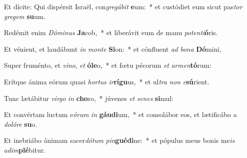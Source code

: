 \item Et dícite: Qui dispérsit Israël, con\textit{gre}\textit{gá}\textit{bit} \textbf{e}um:~* et custódiet eum sicut pas\textit{tor} \textit{gre}\textit{gem} \textbf{su}um.
\item Redémit enim \textit{Dó}\textit{mi}\textit{nus} \textbf{Ja}cob,~* et liberávit eum de manu \textit{pot}\textit{en}\textit{ti}\textbf{ó}ris.
\item Et vénient, et laudábunt \textit{in} \textit{mon}\textit{te} \textbf{Si}on:~* et cónfluent \textit{ad} \textit{bo}\textit{na} \textbf{Dó}mini,
\item Super fruménto, et \textit{vi}\textit{no}, \textit{et} \textbf{ó}\textbf{le}o,~* et fœtu pécorum \textit{et} \textit{ar}\textit{men}\textbf{tó}rum:
\item Erítque ánima eórum quasi \textit{hor}\textit{tus} \textit{ir}\textbf{rí}\textbf{gu}us,~* et ul\textit{tra} \textit{non} \textit{e}\textbf{sú}rient.
\item Tunc lætábitur \textit{vir}\textit{go} \textit{in} \textbf{cho}ro,~* júvenes \textit{et} \textit{se}\textit{nes} \textbf{si}mul:
\item Et convértam luctum e\textit{ó}\textit{rum} \textit{in} \textbf{gáu}\textbf{di}um,~* et consolábor eos, et lætificábo a \textit{do}\textit{ló}\textit{re} \textbf{su}o.
\item Et inebriábo ánimam sacer\textit{dó}\textit{tum} \textit{pin}\textbf{gué}\textbf{di}ne:~* et pópulus meus bonis me\textit{is} \textit{ad}\textit{im}\textbf{plé}bitur.
